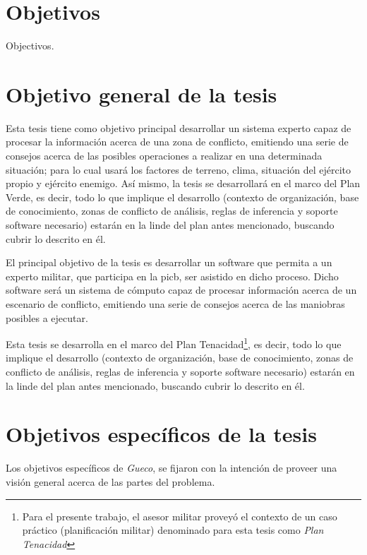 \section{Objetivos}
Objectivos.

\section{Objetivo general de la tesis}
Esta tesis tiene como objetivo principal desarrollar un sistema experto capaz de procesar la información acerca de una zona de conflicto, emitiendo una serie de consejos acerca de las posibles operaciones a realizar en una determinada situación; para lo cual usará los factores de terreno, clima, situación del ejército propio y ejército enemigo. Así mismo, la tesis se desarrollará en el marco del Plan Verde, es decir, todo lo que implique el desarrollo (contexto de organización, base de conocimiento, zonas de conflicto de análisis, reglas de inferencia y soporte software necesario) estarán en la linde del plan antes mencionado, buscando cubrir lo descrito en él.

El principal objetivo de la tesis es desarrollar un software que permita a un experto militar, que participa en la \gls{picb}, ser asistido en dicho proceso. Dicho software será un sistema de cómputo capaz de procesar información acerca de un escenario de conflicto, emitiendo una serie de consejos acerca de las maniobras posibles a ejecutar.

Esta tesis se desarrolla en el marco del Plan Tenacidad\footnote{Para el presente trabajo, el asesor militar proveyó el contexto de un caso práctico (planificación militar) denominado para esta tesis como \emph{Plan Tenacidad}}, es decir, todo lo que implique el desarrollo (contexto de organización, base de conocimiento, zonas de conflicto de análisis, reglas de inferencia y soporte software necesario) estarán en la linde del plan antes mencionado, buscando cubrir lo descrito en él.




\section{Objetivos específicos de la tesis}

Los objetivos específicos de \emph{Gueco}, se fijaron con la intención de proveer una visión general acerca de las partes del problema.

